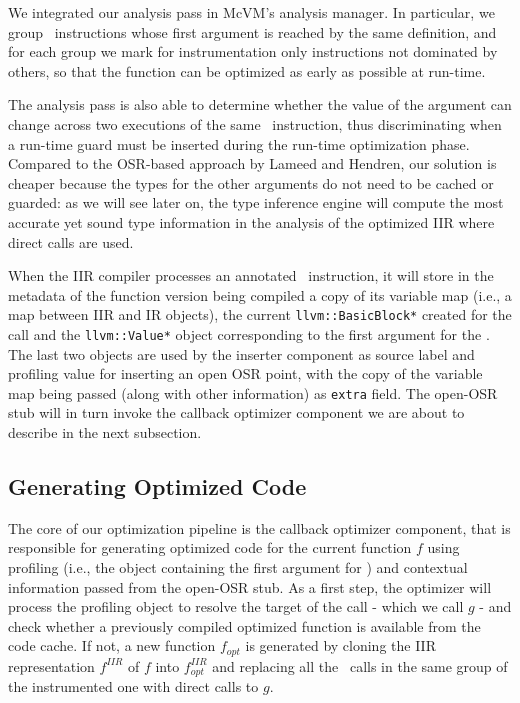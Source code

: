 We integrated our analysis pass in McVM's analysis manager. In particular, we group \feval\ instructions whose first argument is reached by the same definition, and for each group we mark for instrumentation only instructions not dominated by others, so that the function can be optimized as early as possible at run-time.

The analysis pass is also able to determine whether the value of the argument can change across two executions of the same \feval\ instruction, thus discriminating when a run-time guard must be inserted during the run-time optimization phase. Compared to the OSR-based approach by Lameed and Hendren, our solution is cheaper because the types for the other arguments do not need to be cached or guarded: as we will see later on, the type inference engine will compute the most accurate yet sound type information in the analysis of the optimized IIR where direct calls are used.

When the IIR compiler processes an annotated \feval\ instruction, it will store in the metadata of the function version being compiled a copy of its variable map (i.e., a map between IIR and IR objects), the current {\tt llvm::BasicBlock*} created for the call and the {\tt llvm::Value*} object corresponding to the first argument for the \feval. The last two objects are used by the inserter component as source label and profiling value for inserting an open OSR point, with the copy of the variable map being passed (along with other information) as {\tt extra} field. The open-OSR stub will in turn invoke the callback optimizer component we are about to describe in the next subsection.

\subsection{Generating Optimized Code}
The core of our optimization pipeline is the callback optimizer component, that is responsible for generating optimized code for the current function $f$ using profiling (i.e., the object containing the first argument for \feval) and contextual information passed from the open-OSR stub. As a first step, the optimizer will process the profiling object to resolve the target of the call - which we call $g$ -  and check whether a previously compiled optimized function is available from the code cache. If not, a new function $f_{opt}$ is generated by cloning the IIR representation $f^{IIR}$ of $f$ into
 $f^{IIR}_{opt}$ and replacing all the \feval\ calls in the same group of the instrumented one with direct calls to $g$.

